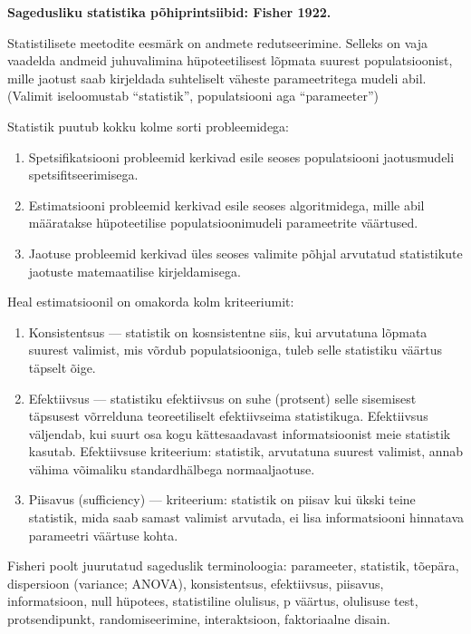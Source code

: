 \documentclass[]{book}
\begin{document}
\textbf{Sagedusliku statistika põhiprintsiibid: Fisher 1922.}

Statistilisete meetodite eesmärk on andmete redutseerimine. Selleks on vaja vaadelda andmeid juhuvalimina hüpoteetilisest lõpmata suurest populatsioonist, mille jaotust saab kirjeldada suhteliselt väheste parameetritega mudeli abil. (Valimit iseloomustab ``statistik'', populatsiooni aga ``parameeter'')

Statistik puutub kokku kolme sorti probleemidega:

\begin{enumerate}
\def\labelenumi{\arabic{enumi}.}
\item
  Spetsifikatsiooni probleemid kerkivad esile seoses populatsiooni jaotusmudeli spetsifitseerimisega.
\item
  Estimatsiooni probleemid kerkivad esile seoses algoritmidega, mille abil määratakse hüpoteetilise populatsioonimudeli parameetrite väärtused.
\item
  Jaotuse probleemid kerkivad üles seoses valimite põhjal arvutatud statistikute jaotuste matemaatilise kirjeldamisega.
\end{enumerate}

Heal estimatsioonil on omakorda kolm kriteeriumit:

\begin{enumerate}
\def\labelenumi{\arabic{enumi}.}
\item
  Konsistentsus --- statistik on kosnsistentne siis, kui arvutatuna lõpmata suurest valimist, mis võrdub populatsiooniga, tuleb selle statistiku väärtus täpselt õige.
\item
  Efektiivsus --- statistiku efektiivsus on suhe (protsent) selle sisemisest täpsusest võrrelduna teoreetiliselt efektiivseima statistikuga. Efektiivsus väljendab, kui suurt osa kogu kättesaadavast informatsioonist meie statistik kasutab. Efektiivsuse kriteerium: statistik, arvutatuna suurest valimist, annab vähima võimaliku standardhälbega normaaljaotuse.
\item
  Piisavus (sufficiency) --- kriteerium: statistik on piisav kui ükski teine statistik, mida saab samast valimist arvutada, ei lisa informatsiooni hinnatava parameetri väärtuse kohta.
\end{enumerate}

Fisheri poolt juurutatud sageduslik terminoloogia: parameeter, statistik, tõepära, dispersioon (variance; ANOVA), konsistentsus, efektiivsus, piisavus, informatsioon, null hüpotees, statistiline olulisus, p väärtus, olulisuse test, protsendipunkt, randomiseerimine, interaktsioon, faktoriaalne disain.
\end{document}
